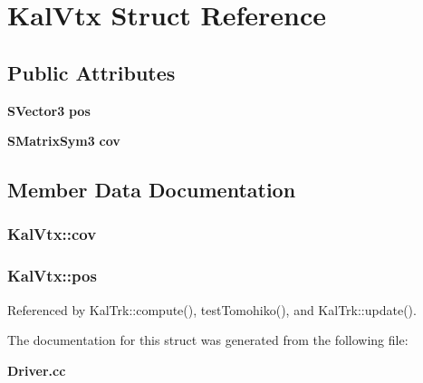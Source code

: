 \section{Kal\-Vtx Struct Reference}
\label{structKalVtx}
\subsection*{Public Attributes}
\begin{DoxyCompactItemize}
\item 
{\bf S\-Vector3} {\bf pos}
\item 
{\bf S\-Matrix\-Sym3} {\bf cov}
\end{DoxyCompactItemize}


\subsection{Member Data Documentation}
\subsubsection[{cov}]{ Kal\-Vtx\-::cov}\label{structKalVtx_af8a828c525c9de8deab7bf7d5bbdbace}
\subsubsection[{pos}]{ Kal\-Vtx\-::pos}\label{structKalVtx_a927c9a301adf4f70acf4856232083ad6}


Referenced by Kal\-Trk\-::compute(), test\-Tomohiko(), and Kal\-Trk\-::update().



The documentation for this struct was generated from the following file\-:\begin{DoxyCompactItemize}
\item 
{\bf Driver.\-cc}\end{DoxyCompactItemize}
